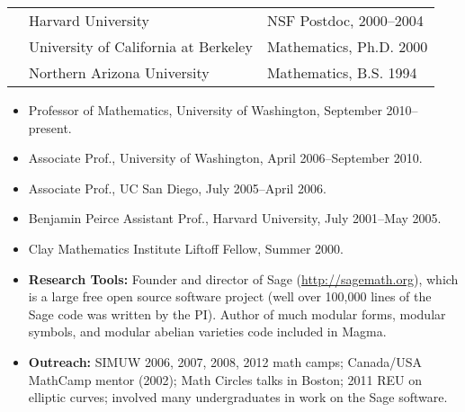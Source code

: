 \documentclass[11pt]{article}
\begin{document}


%
\begin{center}
\begin{tabular}{lll}
\mbox{}\hspace{3.2ex}
&  Harvard University & NSF Postdoc, 2000--2004 \\
&  University of California at Berkeley & Mathematics, Ph.D. 2000 \\
&   Northern Arizona University\hspace{1.03in}\mbox{}& Mathematics, B.S. 1994 \\
\end{tabular}
\end{center}

\begin{itemize}\setlength{\itemsep}{-0.8ex}
\item Professor of Mathematics,
University of Washington, September 2010--present.
\item Associate Prof.,
University of Washington, April 2006--September 2010.
\item Associate Prof.,
UC San Diego, July 2005--April 2006.
\item Benjamin Peirce Assistant Prof., 
Harvard University, July 2001--May 2005.
\item Clay Mathematics Institute Liftoff Fellow, Summer 2000.
\end{itemize}

\begin{itemize}\setlength{\itemsep}{-0.5ex}

\item {\bf Research Tools:} Founder and director of Sage
  (\url{http://sagemath.org}), which is a large free open source software
  project (well over 100,000 lines of the Sage code was written by the
  PI).  Author of much modular forms, modular symbols, and modular
  abelian varieties code included in Magma.


\item {\bf Outreach:} SIMUW 2006, 2007, 2008, 2012  math
  camps; Canada/USA MathCamp mentor (2002); Math Circles talks in
  Boston; 2011 REU on elliptic curves; involved many
  undergraduates in work on the Sage software.
\end{itemize}
\end{document}
